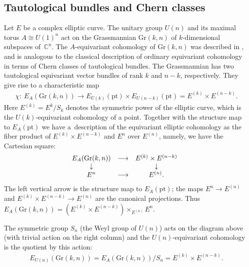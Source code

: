 \documentclass[10pt,a4paper]{amsart}
\numberwithin{equation}{section}
\begin{document}
\subsection{Tautological bundles and Chern classes}\label{ss-eecG}
Let $E$ be a complex elliptic curve. The unitary group $U(n)$ and its maximal torus $A\cong U(1)^n$ act on the Grassmannian $\mathrm{Gr}(k,n)$ of $k$-dimensional subspaces of~$\mathbb C^n$. The $A$-equivariant cohomo\-logy of $\mathrm{Gr}(k,n)$ was described in \cite[Section~1.9]{GKV}, and is analogous to the classical description of ordinary equivariant cohomology in terms of Chern classes of tautological bundles. The Grassmannian has two tautological equivariant vector bundles of rank $k$ and $n-k$, respectively. They give rise to a characteristic map~\cite{GKV}
\begin{gather*} \chi\colon \ E_A(\mathrm{Gr}(k,n))\to E_{U(k)}(\mathrm{pt})\times E_{U(n-k)}(\mathrm{pt})=E^{(k)}\times E^{(n-k)}.
\end{gather*} Here $E^{(k)}=E^k/S_k$ denotes the symmetric power of the elliptic curve, which is the $U(k)$-equivariant cohomology of a point. Together with the structure map to $E_A(\mathrm{pt})$ we have a~description of
the equivariant elliptic cohomology as the fiber product of $E^{(k)}\times E^{(n-k)}$ and $E^n$ over $E^{(n)}$, namely, we have the Cartesian square:
\begin{gather*}
 \begin{array}{@{}ccc}
 E_A(\mathrm{Gr}(k,n))&\longrightarrow&E^{(k)}\times E^{(n-k)}\\
 \downarrow& &\downarrow\\ E^n&\longrightarrow&E^{(n)}.
 \end{array}
\end{gather*}
The left vertical arrow is the structure map to $E_A(\mathrm{pt})$; the maps $E^n\to E^{(n)}$ and $E^{(k)}\times E^{(n-k)}\to E^{(n)} $ are the canonical projections. Thus $ E_A(\mathrm{Gr}(k,n))=(E^{(k)}\times
E^{(n-k)})\times_{E^{(n)}}E^n $.

The symmetric group $S_n$ (the Weyl group of $U(n)$) acts on the diagram above (with trivial action on the right column) and the $U(n)$-equivariant cohomology is the quotient by this action:
\begin{gather*}
 E_{U(n)}(\mathrm{Gr}(k,n))=E_A(\mathrm{Gr}(k,n))/S_n=E^{(k)}\times E^{(n-k)}.
\end{gather*}
\end{document}

